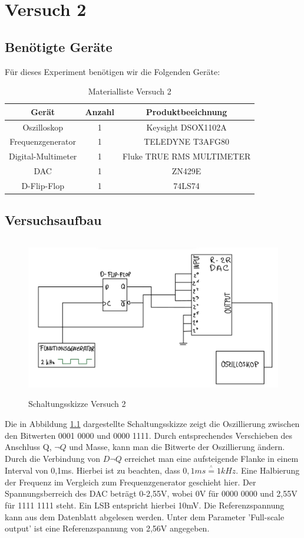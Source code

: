 \chapter{Versuch 2}

\section{Benötigte Geräte}

Für dieses Experiment benötigen wir die Folgenden Geräte:
\begin{table}[h]	
	\centering
	\begin{tabular}[h]{c|c|c}
		Gerät & Anzahl & Produktbeeichnung\\
		\hline
		Oszilloskop & 1  & Keysight DSOX1102A\\
		\hline
		Frequenzgenerator & 1 & TELEDYNE T3AFG80\\
		\hline 
		Digital-Multimeter & 1 & Fluke TRUE RMS MULTIMETER\\
		\hline
		DAC & 1 & ZN429E \\
		\hline
		D-Flip-Flop & 1 & 74LS74
	\end{tabular}
	\caption{Materialliste Versuch 2}
	\label{tab:Materialliste Versuch 2}
\end{table}

\section{Versuchsaufbau}
\label{sec:Versuchsaufbau}
\begin{figure}[H]
	\centering
	\includegraphics[height=7cm]{images/schaltungsskizze-versuch-zwei.jpeg} 
	\caption{Schaltungsskizze Versuch 2}
	\label{fig: Schaltungsskizze Versuch 2}
\end{figure}
Die in Abbildung \ref{fig: Schaltungsskizze Versuch 2} dargestellte Schaltungsskizze
zeigt die Oszillierung zwischen den Bitwerten 0001 0000 und 0000 1111. Durch entsprechendes
Verschieben des Anschluss Q, $\neg Q$ und Masse, kann man die Bitwerte der 
Oszillierung ändern.
Durch die Verbindung von $D\neg Q$ erreichet man eine aufsteigende Flanke
in einem Interval von 0,1ms. Hierbei ist zu beachten, dass $0,1ms \stackrel{^\wedge}{=} 1kHz$. 
Eine Halbierung der Frequenz im Vergleich zum Frequenzgenerator geschieht hier.
Der Spannungsberreich des DAC beträgt 0-2,55V, wobei 0V für 0000 0000 
und 2,55V für 1111 1111 steht. Ein LSB entspricht hierbei 10mV.
Die Referenzspannung kann aus dem Datenblatt abgelesen werden. Unter dem 
Parameter 'Full-scale output' ist eine Referenzspannung von 2,56V angegeben.


